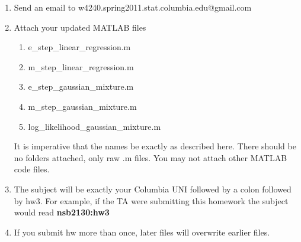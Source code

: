 \documentclass[12pt]{article}
\begin{document}
\begin{enumerate}
	\item Send an email to w4240.spring2011.stat.columbia.edu@gmail.com
	\item {Attach your updated MATLAB files 
		\begin{enumerate}
			\item e\_step\_linear\_regression.m
			\item m\_step\_linear\_regression.m
			\item e\_step\_gaussian\_mixture.m
			\item m\_step\_gaussian\_mixture.m
			\item  log\_likelihood\_gaussian\_mixture.m
		\end{enumerate} It is imperative that the names be exactly as described here. There should be no folders attached, only raw .m files.  You may not attach other MATLAB code files. }
	\item The subject will be exactly your Columbia UNI followed by a colon followed by hw3.  For example, if the TA were submitting this homework the subject would read {\bf nsb2130:hw3}
	\item If you submit hw more than once, later files will overwrite earlier files.
\end{enumerate}


\problemsdone
\end{document}
